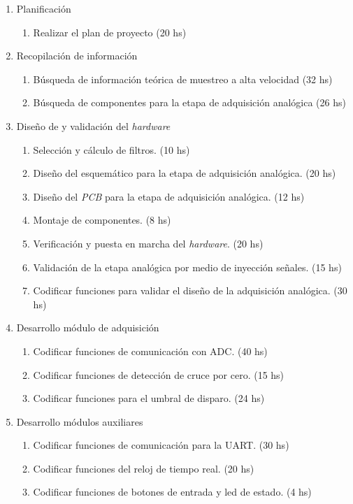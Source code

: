 \documentclass[11pt]{charter}
\begin{document}
\begin{enumerate}
\item Planificación
	\begin{enumerate}
	\item Realizar el plan de proyecto (20 hs)
	\end{enumerate}
\item Recopilación de información
	\begin{enumerate}
	\item Búsqueda de información teórica de muestreo a alta velocidad (32 hs)
	\item Búsqueda de componentes para la etapa de adquisición analógica (26 hs)
	\end{enumerate}
\item Diseño de y validación del \textit{hardware}
	\begin{enumerate}
	\item Selección y cálculo de filtros. (10 hs)
	\item Diseño del esquemático para la etapa de adquisición analógica. (20 hs)
	\item Diseño del \textit{PCB} para la etapa de adquisición analógica. (12 hs)
	\item Montaje de componentes. (8 hs)
	\item Verificación y puesta en marcha del \textit{hardware}. (20 hs)
	\item Validación de la etapa analógica por medio de inyección señales. (15 hs)
	\item Codificar funciones para validar el diseño de la adquisición analógica. (30 hs)
	\end{enumerate}
\item Desarrollo módulo de adquisición
	\begin{enumerate}
	\item Codificar funciones de comunicación con ADC. (40 hs)
	\item Codificar funciones de detección de cruce por cero. (15 hs)
	\item Codificar funciones para el umbral de disparo. (24 hs)
	\end{enumerate}
\item Desarrollo módulos auxiliares
	\begin{enumerate}
	\item Codificar funciones de comunicación para la UART. (30 hs)
	\item Codificar funciones del reloj de tiempo real. (20 hs)
	\item Codificar funciones de botones de entrada y led de estado. (4 hs)

\end{enumerate}
\end{enumerate}
\end{document}
